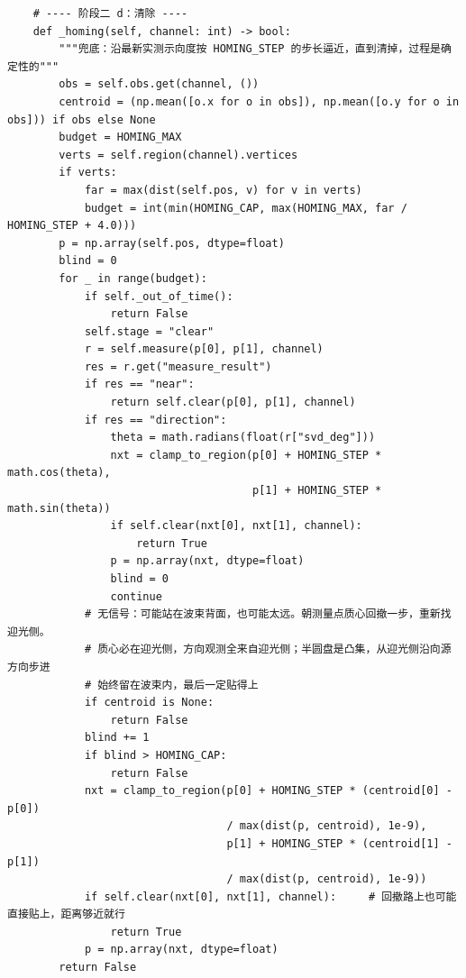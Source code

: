 \documentclass[UTF8, zihao=5,AutoFakeBold=2]{ctexart}
\begin{document}
\begin{lstlisting}
    # ---- 阶段二 d：清除 ----
    def _homing(self, channel: int) -> bool:
        """兜底：沿最新实测示向度按 HOMING_STEP 的步长逼近，直到清掉，过程是确定性的"""
        obs = self.obs.get(channel, ())
        centroid = (np.mean([o.x for o in obs]), np.mean([o.y for o in obs])) if obs else None
        budget = HOMING_MAX
        verts = self.region(channel).vertices
        if verts:
            far = max(dist(self.pos, v) for v in verts)
            budget = int(min(HOMING_CAP, max(HOMING_MAX, far / HOMING_STEP + 4.0)))
        p = np.array(self.pos, dtype=float)
        blind = 0
        for _ in range(budget):
            if self._out_of_time():
                return False
            self.stage = "clear"
            r = self.measure(p[0], p[1], channel)
            res = r.get("measure_result")
            if res == "near":
                return self.clear(p[0], p[1], channel)
            if res == "direction":
                theta = math.radians(float(r["svd_deg"]))
                nxt = clamp_to_region(p[0] + HOMING_STEP * math.cos(theta),
                                      p[1] + HOMING_STEP * math.sin(theta))
                if self.clear(nxt[0], nxt[1], channel):
                    return True
                p = np.array(nxt, dtype=float)
                blind = 0
                continue
            # 无信号：可能站在波束背面，也可能太远。朝测量点质心回撤一步，重新找迎光侧。
            # 质心必在迎光侧，方向观测全来自迎光侧；半圆盘是凸集，从迎光侧沿向源方向步进
            # 始终留在波束内，最后一定贴得上
            if centroid is None:
                return False
            blind += 1
            if blind > HOMING_CAP:
                return False
            nxt = clamp_to_region(p[0] + HOMING_STEP * (centroid[0] - p[0])
                                  / max(dist(p, centroid), 1e-9),
                                  p[1] + HOMING_STEP * (centroid[1] - p[1])
                                  / max(dist(p, centroid), 1e-9))
            if self.clear(nxt[0], nxt[1], channel):     # 回撤路上也可能直接贴上，距离够近就行
                return True
            p = np.array(nxt, dtype=float)
        return False


\end{lstlisting}
\end{document}
